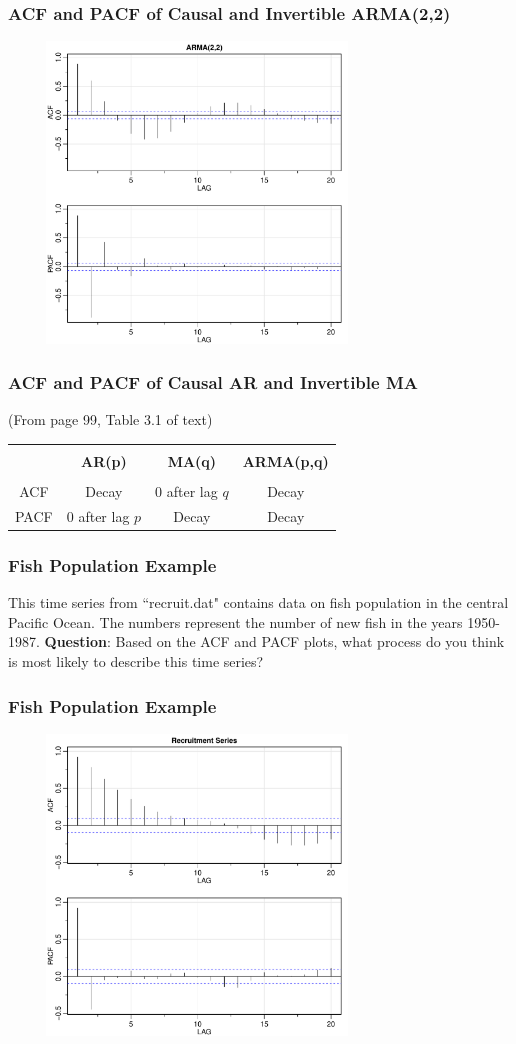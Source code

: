 \documentclass[%
xcolor=pdftex]{beamer}
\begin{document}
\begin{frame}
\frametitle{ACF and PACF of Causal and Invertible ARMA(2,2)}

\includegraphics[width=100mm, height=80mm]{arma.pdf}

\end{frame}

\begin{frame}
\frametitle{ACF and PACF of Causal AR and Invertible MA}

(From page 99, Table 3.1 of text)

\begin{center}
\begin{tabular}{cccc}
\hline \\
 & \textbf{AR(p)} & \textbf{MA(q)} & \textbf{ARMA(p,q)} \\
\hline \\
ACF & Decay & 0 after lag $q$ & Decay\\
PACF & 0 after lag $p$ & Decay & Decay\\
\hline
\end{tabular}
\end{center}

\end{frame}

\begin{frame}
\frametitle{Fish Population Example}

This time series from ``recruit.dat" contains data on fish population in the central Pacific Ocean. The numbers represent the number of new fish in the years 1950-1987. \textbf{Question}: Based on the ACF and PACF plots, what process do you think is most likely to describe this time series?

\end{frame}

\begin{frame}
\frametitle{Fish Population Example}

\includegraphics[width=100mm, height=80mm]{recruit.pdf}

\end{frame}
\end{document}
